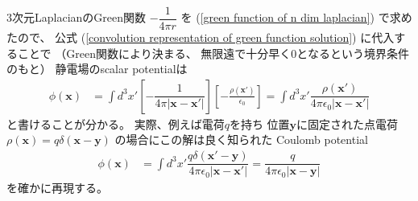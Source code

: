 $3$次元LaplacianのGreen関数
$ - \dfrac{1}{4 \pi r} $
を
(\ref{green function of n dim laplacian})
で求めたので、
公式
(\ref{convolution representation of green function solution})
に代入することで
（Green関数により決まる、
無限遠で十分早く$0$となるという境界条件のもと）
静電場のscalar potentialは
\begin{align}
  \phi (\bm{x})
&=
  \int d^3 x'
  \left[
    - \dfrac{1}{
      4 \pi |\bm{x} - \bm{x}'|
    }
  \right]
  \left[
    - \frac{\rho(\bm{x}')}{\epsilon_0}
  \right]
=
  \int d^3 x'
    \dfrac{\rho(\bm{x}')}{
      4 \pi \epsilon_0
      |\bm{x} - \bm{x}'|
    }
\end{align}
と書けることが分かる。
実際、例えば電荷$q$を持ち
位置$\bm{y}$に固定された点電荷
$\rho(\bm{x})
= q \delta(\bm{x} - \bm{y})$
の場合にこの解は良く知られた
Coulomb potential
\begin{align}
  \phi (\bm{x})
&=
  \int d^3 x'
    \dfrac{
      q \delta(\bm{x}' - \bm{y})
    }{
      4 \pi \epsilon_0
      |\bm{x} - \bm{x}'|
    }
=
    \dfrac{ q }{
      4 \pi \epsilon_0
      |\bm{x} - \bm{y}|
    }
\label{coulomb potential of point charge}
\end{align}
を確かに再現する。

